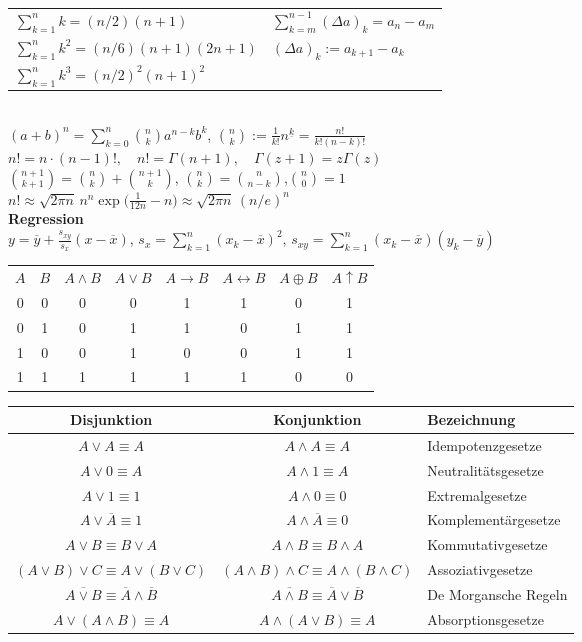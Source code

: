 \documentclass[a4paper,10pt,fleqn,twoside,twocolumn,dvipdfmx]{scrartcl}
\newcommand{\strong}[1]{\textsf{\textbf{#1}}}
\newcommand{\ds}{\displaystyle}
\begin{document}
\begin{tabular}{@{}l|l}
$\sum_{k=1}^n k = (n/2)(n+1)$ & $\sum_{k=m}^{n-1}(\Delta a)_k = a_n-a_m$\\
$\sum_{k=1}^n k^2 = (n/6)(n+1)(2n+1)$ & $(\Delta a)_k := a_{k+1}-a_k$\\
$\sum_{k=1}^n k^3 = (n/2)^2(n+1)^2$
\end{tabular}\\
$\ds (a+b)^n = {\textstyle\sum\limits_{k=0}^n} \binom{n}{k}a^{n-k} b^k$,\quad
$\ds\binom{n}{k} := \frac{1}{k!}n^{\underline k} = \frac{n!}{k!(n-k)!}$\\
$n! = n\cdot (n-1)!,\quad n!=\Gamma(n+1),\quad \Gamma(z+1) = z\Gamma(z)$\\
$\binom{n+1}{k+1} = \binom{n}{k}+\binom{n+1}{k}$,\quad
$\binom{n}{k} = \binom{n}{n-k}$,\quad $\binom{n}{0} = 1$\\[2pt]
$n! \approx\sqrt{2\pi n}\,n^n \exp\big(\frac{1}{12n}-n\big)
\approx\sqrt{2\pi n}\,(n/e)^n$\\[4pt]
\strong{Regression}\\[2pt]
$\ds y = \overline y + \frac{s_{xy}}{s_x}(x{-}\overline x)$,\;
$s_x = \sum\limits_{k=1}^n (x_k{-}\overline x)^2$,\;
$s_{xy} = \sum\limits_{k=1}^n (x_k{-}\overline x)(y_k{-}\overline y)$

\clearpage

\noindent
\begin{tabular}{@{}cccccccc@{}}
\toprule
$A$ & $B$ & $A\land B$ & $A\lor B$
& $A\rightarrow B$ & $A\leftrightarrow B$ & $A\oplus B$ & $A\uparrow B$\\
0 & 0 & 0 & 0 & 1 & 1 & 0 & 1\\
0 & 1 & 0 & 1 & 1 & 0 & 1 & 1\\
1 & 0 & 0 & 1 & 0 & 0 & 1 & 1\\
1 & 1 & 1 & 1 & 1 & 1 & 0 & 0
\end{tabular}

\begingroup\footnotesize
\noindent
\begin{tabular}{@{}c@{\;\;}|@{\;\;}c@{\;\;}|@{\;\;}l@{}}
\toprule
\strong{Disjunktion} & \strong{Konjunktion} & \strong{Bezeichnung}\\
\midrule
  $A\lor A \equiv A$
& $A\land A \equiv A$
& Idempotenzgesetze\\
  $A\lor 0 \equiv A$
& $A\land 1 \equiv A$
& Neutralitätsgesetze\\
  $A\lor 1 \equiv 1$
& $A\land 0 \equiv 0$
& Extremalgesetze\\
  $A\lor \overline A \equiv 1$
& $A\land \overline A \equiv 0$
& Komplementärgesetze\\
\midrule
  $A\lor B \equiv B\lor A$
& $A\land B \equiv B\land A$
& Kommutativgesetze\\
  $(A{\lor}B){\lor}C \equiv A{\lor}(B{\lor}C)$
& $(A{\land}B){\land}C \equiv A{\land}(B{\land}C)$
& Assoziativgesetze\\
  $\overline{A\lor B} \equiv \overline A\land\overline B$
& $\overline{A\land B} \equiv \overline A\lor\overline B$
& De Morgansche Regeln\\
  $A\lor (A\land B) \equiv A$
& $A\land (A\lor B) \equiv A$
& Absorptionsgesetze\\
\bottomrule
\end{tabular}
\endgroup
\end{document}
